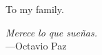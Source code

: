 

\copyrightpage  %

\commcertpage   %

\titlepage      %


\begin{dedication}		%
To my family.

\end{dedication}

\begin{epigraph}		%
\begin{center}
    \textit{Merece lo que sueñas.}
    \\\hspace{4em}---Octavio Paz
\end{center}
\end{epigraph}


